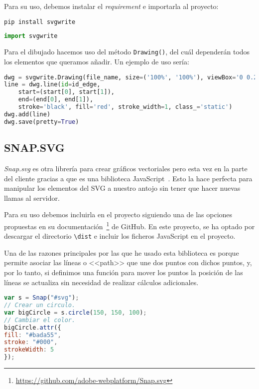 Para su uso, debemos instalar el \textit{requirement} e importarla al proyecto:
\renewcommand{\lstlistingname}{SVGWRITE}
\renewcommand{\lstlistlistingname}{List of \lstlistingname s}
\begin{lstlisting}[language=python,caption={Instalación mediante pip.}]
pip install svgwrite
\end{lstlisting}
\begin{lstlisting}[language=python,caption={Importación.}]
import svgwrite
\end{lstlisting}

Para el dibujado hacemos uso del método \texttt{Drawing()}, del cuál dependerán todos los elementos que queramos añadir. Un ejemplo de uso sería:
\begin{lstlisting}[language=python,caption={Ejemplo de uso.}]
dwg = svgwrite.Drawing(file_name, size=('100%', '100%'), viewBox='0 0.2 1 1.5', profile='full')
line = dwg.line(id=id_edge,
	start=(start[0], start[1]),
	end=(end[0], end[1]),
	stroke='black', fill='red', stroke_width=1, class_='static')
dwg.add(line)	
dwg.save(pretty=True)
\end{lstlisting}



\subsection{SNAP.SVG}\label{snapsvg}
\textit{Snap.svg} es otra librería para crear gráficos vectoriales pero esta vez en la parte del cliente gracias a que es una biblioteca JavaScript~\cite{doc:snapsvg}. Esto la hace perfecta para manipular los elementos del SVG a nuestro antojo sin tener que hacer nuevas llamas al servidor.

Para su uso debemos incluirla en el proyecto siguiendo una de las opciones propuestas en su documentación~\footnote{\url{https://github.com/adobe-webplatform/Snap.svg}} de GitHub. En este proyecto, se ha optado por descargar el directorio \texttt{\textbackslash{dist}} e incluir los ficheros JavaScript en el proyecto.

Una de las razones principales por las que he usado esta biblioteca es porque permite asociar las líneas o <<path>> que une dos puntos con dichos puntos, y, por lo tanto, si definimos una función para mover los puntos la posición de las líneas se actualiza sin necesidad de realizar cálculos adicionales.
\renewcommand{\lstlistingname}{Snap.svg}
\renewcommand{\lstlistlistingname}{List of \lstlistingname s}
\begin{lstlisting}[language=javascript,caption={Ejemplo}]
var s = Snap("#svg");
// Crear un circulo.
var bigCircle = s.circle(150, 150, 100);
// Cambiar el color.
bigCircle.attr({
fill: "#bada55",
stroke: "#000",
strokeWidth: 5
});
\end{lstlisting}



